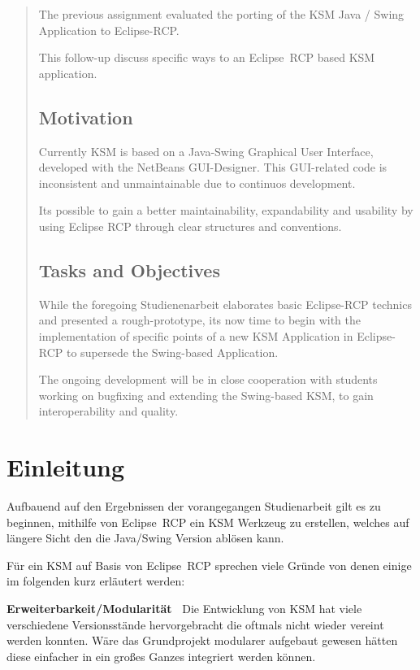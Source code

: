 \documentclass[%
12pt,titlepage,abstracton,DIV=10]{scrreprt}
\begin{document}
\renewcommand{\abstractname}{Summary}
\begin{abstract}
The previous assignment evaluated the porting of the KSM Java / Swing
Application to Eclipse-RCP.

This follow-up discuss specific ways  to an Eclipse~RCP based KSM application.

\section*{Motivation} Currently KSM is based on a Java-Swing Graphical User
Interface, developed with the NetBeans GUI-Designer. This GUI-related code is
inconsistent and unmaintainable due to continuos development.

Its possible to gain a better maintainability, expandability and usability by
using Eclipse RCP through clear structures and conventions.

\section*{Tasks and Objectives}
While the foregoing Studienenarbeit elaborates
basic Eclipse-RCP technics and presented a rough-prototype, its now time to
begin with the implementation of specific points of a new KSM Application in
Eclipse-RCP to supersede the Swing-based Application.

The ongoing development will be in close cooperation with students working on
bugfixing and extending the Swing-based KSM, to gain interoperability and quality.
\end{abstract}

\tableofcontents
\newpage{}

\chapter{Einleitung}
Aufbauend auf den Ergebnissen der vorangegangen Studienarbeit gilt es zu
beginnen, mithilfe von Eclipse~RCP ein KSM Werkzeug zu erstellen, welches auf
längere Sicht den die Java/Swing Version ablösen kann.

Für ein KSM auf Basis von Eclipse~RCP sprechen viele Gründe von denen einige
im folgenden kurz erläutert werden:

\textbf{Erweiterbarkeit/Modularität\ } Die Entwicklung von KSM hat viele
verschiedene Versionsstände hervorgebracht die oftmals nicht wieder vereint
werden konnten. Wäre das Grundprojekt modularer aufgebaut gewesen hätten diese
einfacher in ein großes Ganzes integriert werden können.
\end{document}
